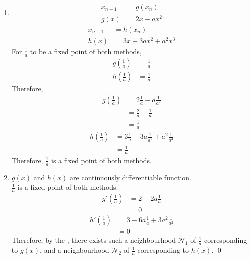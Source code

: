 \documentclass[fleqn, a4paper, 11pt, oneside]{amsart}
\theoremstyle{definition}
\theoremstyle{theorem}
\begin{document}
\begin{solution}
	\begin{enumerate}[leftmargin=*]
		\item
			\begin{align*}
				x_{n + 1} & = g(x_n) \\
				g(x)      & = 2 x - a x^2
			\end{align*}
			\begin{align*}
				x_{n + 1} & = h(x_n) \\
				h(x)      & = 3 x - 3 a x^2 + a^2 x^3
			\end{align*}
			For $\frac{1}{a}$ to be a fixed point of both methods,
			\begin{align*}
				g\left( \frac{1}{a} \right) & = \frac{1}{a} \\
				h\left( \frac{1}{a} \right) & = \frac{1}{a}
			\end{align*}
			Therefore,
			\begin{align*}
				g\left( \frac{1}{a} \right) & = 2 \frac{1}{a} - a \frac{1}{a^2} \\
                                                            & = \frac{2}{a} - \frac{1}{a}       \\
                                                            & = \frac{1}{a}
			\end{align*}
			\begin{align*}
				h\left( \frac{1}{a} \right) & = 3 \frac{1}{a} - 3 a \frac{1}{a^2} + a^2 \frac{1}{a^3} \\
                                                            & = \frac{1}{a}
			\end{align*}
			Therefore, $\frac{1}{a}$ is a fixed point of both methods.
		\item
			$g(x)$ and $h(x)$ are continuously differentiable function.\\
			$\frac{1}{a}$ is a fixed point of both methods.\\
			\begin{align*}
				g'\left( \frac{1}{a} \right) & = 2 - 2 a \frac{1}{a} \\
                                                             & = 0
			\end{align*}
			\begin{align*}
				h'\left( \frac{1}{a} \right) & = 3 - 6 a \frac{1}{a} + 3 a^2 \frac{1}{a^2} \\
                                                             & = 0
			\end{align*}
			Therefore, by the , there exists such a neighbourhood $\mathcal{N}_1$ of $\frac{1}{a}$ corresponding to $g(x)$, and a neighbourhood $\mathcal{N}_2$ of $\frac{1}{a}$ corresponding to $h(x)$.
			\qed
	\end{enumerate}
\end{solution}
\end{document}
